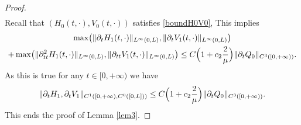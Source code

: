 \documentclass[11pt]{article}
\numberwithin{equation}{section}
\theoremstyle{definition}
\begin{document}
\begin{proof}
\begin{equation*}
\begin{split}
\end{split}
\end{equation*}
Recall that $(H_{0}(t,\cdot),V_{0}(t,\cdot))$ satisfies \eqref{boundH0V0},
{This implies}
\begin{multline*}
\max\bigl(\|\partial_{t}H_{1}(t,\cdot)\|_{L^{\infty}(0,L)},\|\partial_{t}V_{1}(t,\cdot)\|_{L^{\infty}(0,L)}\bigr)\\
+\max\bigl(\|\partial_{tt}^{2}H_{1}(t,\cdot)\|_{L^{\infty}(0,L)},\|\partial_{tt}V_{1}(t,\cdot)\|_{L^{\infty}(0,L)}\bigr)
\leq C\Bigl(1+c_{2} \frac{2}{\mu}\Bigr) \|\partial_{t}Q_{0}\|_{C^{3}([0,+\infty))}.
\end{multline*}
As this is true for any $t\in [0,+\infty)$ we have
\begin{equation*}
\|\partial_{t}H_{1},\partial_{t}V_{1}\|_{C^{1}([0,+\infty),C^{0}([0,L]))}\leq C\Bigl(1+c_{2} \frac{2}{\mu}\Bigr) \|\partial_{t}Q_{0}\|_{C^{3}([0,+\infty))}.
\end{equation*}
This ends the proof of Lemma \ref{lem3}.
\end{proof}
\end{document}
